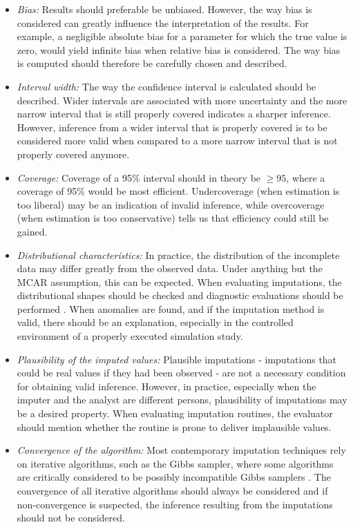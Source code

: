 \documentclass[12pt, a4paper]{article}
\begin{document}
\begin{itemize}
  \item \emph{Bias:} Results should preferable be unbiased. However, the way bias is considered can greatly influence the interpretation of the results. For example, a negligible absolute bias for a parameter for which the true value is zero, would yield infinite bias when relative bias is considered. The way bias is computed should therefore be carefully chosen and described. 
  \item \emph{Interval width:} The way the confidence interval is calculated should be described. Wider intervals are associated with more uncertainty and the more narrow interval that is still properly covered indicates a sharper inference. However, inference from a wider interval that is properly covered is to be considered more valid when compared to a more narrow interval that is not properly covered anymore. 
  \item \emph{Coverage:} Coverage of a 95\% interval should in theory be $\geq 95$, where a coverage of 95\% would be most efficient. Undercoverage (when estimation is too liberal) may be an indication of invalid inference, while overcoverage (when estimation is too conservative) tells us that efficiency could still be gained. 
  \item \emph{Distributional characteristics:} In practice, the distribution of the incomplete data may differ greatly from the observed data. Under anything but the MCAR assumption, this can be expected. When evaluating imputations, the distributional shapes should be checked and diagnostic evaluations should be performed \citep[see][for an detailed overview of diagnostic evaluation for multivariate imputations]{abayomi2008diagnostics}. When anomalies are found, and if the imputation method is valid, there should be an explanation, especially in the controlled environment of a properly executed simulation study. 
  \item \emph{Plausibility of the imputed values:} Plausible imputations - imputations that could be real values if they had been observed - are not a necessary condition for obtaining valid inference. However, in practice, especially when the imputer and the analyst are different persons, plausibility of imputations may be a desired property. When evaluating imputation routines, the evaluator should mention whether the routine is prone to deliver implausible values. 
  \item \emph{Convergence of the algorithm:} Most contemporary imputation techniques rely on iterative algorithms, such as the Gibbs sampler, where some algorithms are critically considered to be possibly incompatible Gibbs samplers \citep[PIGS,][]{li2012imputing}. The convergence of all iterative algorithms should always be considered and if non-convergence is suspected, the inference resulting from the imputations should not be considered.  
  \end{itemize}
\end{document}

